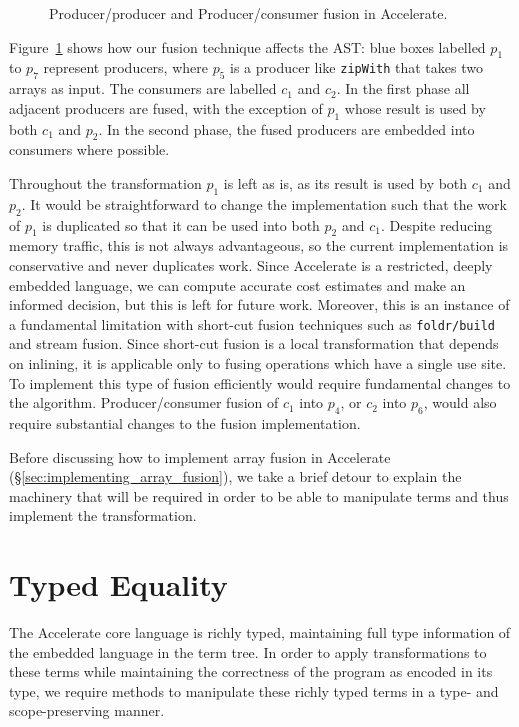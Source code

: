 \begin{figure}[htb]
    \caption[Fusion in Accelerate]{Producer/producer and Producer/consumer fusion in Accelerate.}
    \label{fig:fusion}
\end{figure}

Figure~\ref{fig:fusion} shows how our fusion technique affects the
AST: blue boxes labelled $p_1$ to $p_7$ represent
producers, where $p_5$ is a producer like \texttt{zipWith} that takes two arrays
as input. The consumers are labelled $c_1$ and $c_2$. In the first phase all
adjacent producers are fused, with the exception of $p_1$ whose result is used
by both $c_1$ and $p_2$. In the second phase, the fused producers are embedded
into consumers where possible.

Throughout the transformation $p_1$ is left as is, as its result is used by both
$c_1$ and $p_2$. It would be straightforward to change the implementation such
that the work of $p_1$ is duplicated so that it can be used into both $p_2$ and
$c_1$. Despite reducing memory traffic, this is not always advantageous, so the
current implementation is conservative and never duplicates work. Since
Accelerate is a restricted, deeply embedded language, we can compute accurate
cost estimates and make an informed decision, but this is left for future work.
Moreover, this is an instance of a fundamental limitation with
short-cut fusion techniques such as
\texttt{foldr/build} and stream
fusion. Since short-cut fusion is a local transformation that depends on
inlining, it is applicable only to fusing operations which have a single use
site. To implement this type of fusion efficiently would require fundamental
changes to the algorithm.
%
Producer/consumer fusion of $c_1$ into $p_4$, or $c_2$ into $p_6$, would also
require substantial changes to the fusion implementation.

Before discussing how to implement array fusion in Accelerate
(\S\ref{sec:implementing_array_fusion}), we take a brief detour to explain the
machinery that will be required in order to be able to manipulate terms and thus
implement the transformation.


\section{Typed Equality}
\label{sec:equality}

The Accelerate core language is richly typed, maintaining full type information
of the embedded language in the term tree. In order to apply transformations to
these terms while maintaining the correctness of the program as encoded in its
type, we require methods to manipulate these richly typed terms in a type- and
scope-preserving manner.

